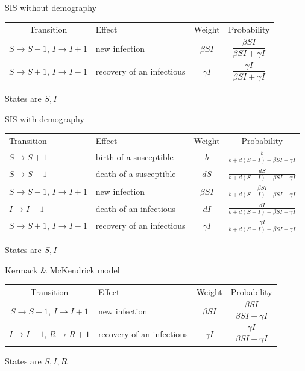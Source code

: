 \documentclass[aspectratio=43]{beamer}
\begin{document}
\begin{frame}{SIS without demography}
    \begin{center}
        \begin{tabular}{cp{3cm}cc}
            Transition & Effect & Weight & Probability \\
            $S\to S-1$, $I\to I+1$ & new infection & $\beta SI$ & $\dfrac{\beta SI}{\beta SI+\gamma I}$ \\
            $S\to S+1$, $I\to I-1$ & recovery of an infectious & $\gamma I$ & $\dfrac{\gamma I}{\beta SI+\gamma I}$
        \end{tabular}
    \end{center}
    \vfill
    States are $S,I$
\end{frame}


\begin{frame}{SIS with demography}
    \begin{center}
        \begin{tabular}{p{3cm}p{3cm}cc}
            Transition & Effect & Weight & Probability \\
            $S\to S+1$ & birth of a susceptible & $b$ & $\frac{b}{b+d(S+I)+\beta SI+\gamma I}$ \\
            $S\to S-1$ & death of a susceptible & $dS$ & $\frac{dS}{b+d(S+I)+\beta SI+\gamma I}$ \\
            $S\to S-1$, $I\to I+1$ & new infection & $\beta SI$ & $\frac{\beta SI}{b+d(S+I)+\beta SI+\gamma I}$ \\
            $I\to I-1$ & death of an infectious & $dI$ & $\frac{dI}{b+d(S+I)+\beta SI+\gamma I}$ \\
            $S\to S+1$, $I\to I-1$ & recovery of an infectious & $\gamma I$ & $\frac{\gamma I}{b+d(S+I)+\beta SI+\gamma I}$ 
        \end{tabular}
    \end{center}
\vfill
States are $S,I$
\end{frame}


\begin{frame}[fragile]{Kermack \& McKendrick model}
    \begin{center}
        \begin{tabular}{cp{3cm}cc}
            Transition & Effect & Weight & Probability \\
            $S\to S-1$, $I\to I+1$ & new infection & $\beta SI$ & $\dfrac{\beta SI}{\beta SI+\gamma I}$ \\
            $I\to I-1$, $R\to R+1$ & recovery of an infectious & $\gamma I$ & $\dfrac{\gamma I}{\beta SI+\gamma I}$ 
        \end{tabular}
    \end{center}
    \vfill
    States are $S,I,R$
\end{frame}
\end{document}

